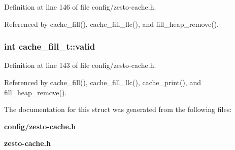 Definition at line 146 of file config/zesto-cache.h.

Referenced by cache\_\-fill(), cache\_\-fill\_\-llc(), and fill\_\-heap\_\-remove().
\subsubsection[{valid}]{\setlength{\rightskip}{0pt plus 5cm}int {\bf cache\_\-fill\_\-t::valid}}\label{structcache__fill__t_7dfd9e284f1ec63ed0f3e6751a9e7658}




Definition at line 143 of file config/zesto-cache.h.

Referenced by cache\_\-fill(), cache\_\-fill\_\-llc(), cache\_\-print(), and fill\_\-heap\_\-remove().

The documentation for this struct was generated from the following files:\begin{CompactItemize}
\item 
{\bf config/zesto-cache.h}\item 
{\bf zesto-cache.h}\end{CompactItemize}
